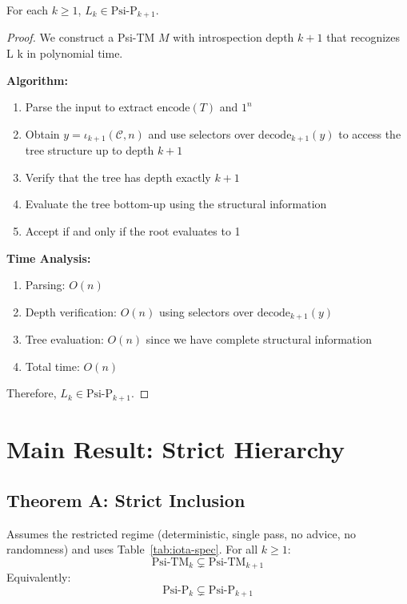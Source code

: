 \begin{claim}
For each $k \geq 1$, $L_k \in \text{Psi-P}_{k+1}$.
\end{claim}

\begin{proof}
We construct a Psi-TM $M$ with introspection depth $k+1$ that recognizes L k in polynomial time.

\textbf{Algorithm:}
\begin{enumerate}
\item Parse the input to extract $\text{encode}(T)$ and $1^n$
\item Obtain $y=\iota_{k+1}(\mathcal{C},n)$ and use selectors over $\mathrm{decode}_{k+1}(y)$ to access the tree structure up to depth $k{+}1$
\item Verify that the tree has depth exactly $k+1$
\item Evaluate the tree bottom-up using the structural information
\item Accept if and only if the root evaluates to 1
\end{enumerate}

\textbf{Time Analysis:}
\begin{enumerate}
\item Parsing: $O(n)$
\item Depth verification: $O(n)$ using selectors over $\mathrm{decode}_{k+1}(y)$
\item Tree evaluation: $O(n)$ since we have complete structural information
\item Total time: $O(n)$
\end{enumerate}

Therefore, $L_k \in \text{Psi-P}_{k+1}$.
\end{proof}

\section{Main Result: Strict Hierarchy}

\subsection{Theorem A: Strict Inclusion}

\begin{theorem}
\label{thm:strict-hierarchy-1}
Assumes the restricted regime (deterministic, single pass, no advice, no randomness) and uses Table~\ref{tab:iota-spec}.
For all $k \geq 1$:
$$\text{Psi-TM}_k \subsetneq \text{Psi-TM}_{k+1}$$
Equivalently:
$$\text{Psi-P}_k \subsetneq \text{Psi-P}_{k+1}$$
\end{theorem}

